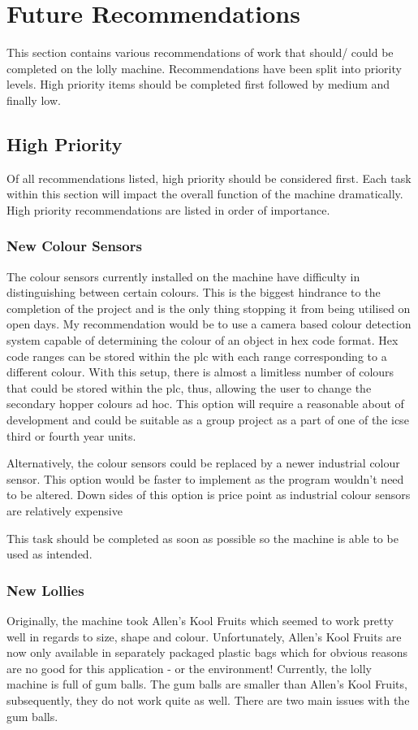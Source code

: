  \section{Future Recommendations}
	This section contains various recommendations of work that should/ could be completed on the lolly machine. Recommendations have been split into priority levels. High priority items should be completed first followed by medium and finally low. 

    \subsection{High Priority}
    Of all recommendations listed, high priority should be considered first. Each task within this section will impact the overall function of the machine dramatically. High priority recommendations are listed in order of importance.
	
        \subsubsection{New Colour Sensors} 
		
            The colour sensors currently installed on the machine have difficulty in distinguishing between certain colours. This is the biggest hindrance to the completion of the project and is the only thing stopping it from being utilised on open days. My recommendation would be to use a camera based colour detection system capable of determining the colour of an object in hex code format. Hex code ranges can be stored within the \acrshort{plc} with each range corresponding to a different colour. With this setup, there is almost a limitless number of colours that could be stored within the \acrshort{plc}, thus, allowing the user to change the secondary hopper colours ad hoc. This option will require a reasonable about of development and could be suitable as a group project as a part of one of the \acrshort{icse} third or fourth year units.
			
			Alternatively, the colour sensors could be replaced by a newer industrial colour sensor. This option would be faster to implement as the program wouldn't need to be altered. Down sides of this option is price point as industrial colour sensors are relatively expensive
			
			This task should be completed as soon as possible so the machine is able to be used as intended. 
			
       \subsubsection{New Lollies} 
            Originally, the machine took Allen's Kool Fruits which seemed to work pretty well in regards to size, shape and colour. Unfortunately, Allen's Kool Fruits are now only available in separately packaged plastic bags which for obvious reasons are no good for this application - or the environment! Currently, the lolly machine is full of gum balls. The gum balls are smaller than Allen's Kool Fruits, subsequently, they do not work quite as well. There are two main issues with the gum balls.
			
